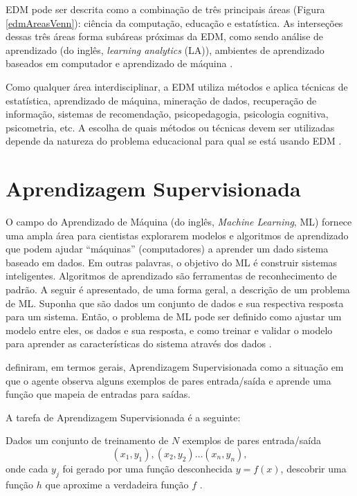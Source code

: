 EDM pode ser descrita como a combinação de três principais áreas (Figura
\ref{edmAreasVenn}): ciência da computação, educação e estatística. As
interseções dessas três áreas forma subáreas próximas da EDM, como sendo análise
de aprendizado (do inglês, \textit{learning analytics} (LA)), ambientes de
aprendizado baseados em computador e aprendizado de máquina
\cite{romero2013data}.


Como qualquer área interdisciplinar, a EDM utiliza métodos e aplica técnicas de
estatística, aprendizado de máquina, mineração de dados, recuperação de
informação, sistemas de recomendação, psicopedagogia, psicologia cognitiva,
psicometria, etc. A escolha de quais métodos ou técnicas devem ser utilizadas
depende da natureza do problema educacional para qual se está usando EDM
\cite{bousbia2014contribution}.

\section{Aprendizagem Supervisionada}

O campo do Aprendizado de Máquina (do inglês, \textit{Machine Learning}, ML)
fornece uma ampla área para cientistas explorarem modelos e algoritmos de
aprendizado que podem ajudar ``máquinas'' (computadores) a aprender um dado
sistema baseado em dados. Em outras palavras, o objetivo do ML é construir
sistemas inteligentes. Algoritmos de aprendizado são ferramentas de
reconhecimento de padrão. A seguir é apresentado, de uma forma geral, a
descrição de um problema de ML. Suponha que são dados um conjunto de dados e sua
respectiva resposta para um sistema. Então, o problema de ML pode ser definido
como ajustar um modelo entre eles, os dados e sua resposta, e como treinar e
validar o modelo para aprender as características do sistema através dos dados
\cite{suthaharan2016machine}.

 definiram, em termos gerais, Aprendizagem
Supervisionada como a situação em que o agente observa alguns exemplos de pares
entrada/saída e aprende uma função que mapeia de entradas para saídas.

A tarefa de Aprendizagem Supervisionada é a seguinte:

Dados um conjunto de treinamento de \(N\) exemplos de pares entrada/saída
\[ (x_1,y_1),(x_2,y_2)\ldots(x_n,y_n), \]
onde cada \(y_j\) foi gerado por uma função desconhecida \(y = f(x)\), descobrir
uma função \(h\) que aproxime a verdadeira função \(f\)
\cite{russell2011artificial}.

